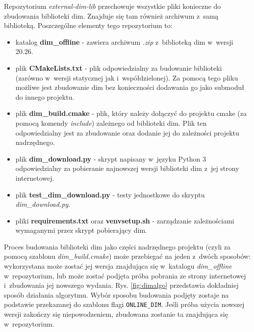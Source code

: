 Repozytorium \textit{external-dim-lib} przechowuje wszystkie pliki konieczne do zbudowania biblioteki \gls*{dim}. Znajduje się tam również archiwum z~samą biblioteką. Poszczególne elementy tego repozytorium to:
\begin{itemize}
\item katalog \textbf{dim\_offline} - zawiera archiwum \textit{.zip} z~biblioteką \gls*{dim} w~wersji 20.26.
\item plik \textbf{CMakeLists.txt} - plik odpowiedzialny za budowanie biblioteki (zarówno w~wersji statycznej jak i~współdzielonej). Za pomocą tego pliku możliwe jest zbudowanie \gls*{dim} bez konieczności dodawania go jako submoduł do innego projektu.
\item plik \textbf{dim\_build.cmake} - plik, który należy dołączyć do projektu \gls*{cmake} (za pomocą komendy \textit{include}) zależnego od biblioteki \gls*{dim}. Plik ten odpowiedzialny jest za zbudowanie oraz dodanie jej do zależności projektu nadrzędnego.
\item plik \textbf{dim\_download.py} - skrypt napisany w~języku Python 3 odpowiedzialny za pobieranie najnowszej wersji biblioteki \gls*{dim} z~jej strony internetowej.
\item plik \textbf{test\_dim\_download.py} - testy jednostkowe do skryptu \textit{dim\_download.py}.
\item pliki \textbf{requirements.txt} oraz \textbf{venvsetup.sh} - zarządzanie zależnościami wymaganymi przez skrypt pobierający \gls*{dim}.
\end{itemize}

Proces budowania biblioteki \gls*{dim} jako części nadrzędnego projektu (czyli za pomocą szablonu \textit{dim\_build.cmake}) może przebiegać na jeden z~dwóch sposobów: wykorzystana może zostać jej wersja znajdująca się w~katalogu \textit{dim\_offline} w~repozytorium, lub może zostać podjęta próba pobrania ze strony internetowej i~zbudowania jej nowszego wydania. Rys. \ref{fig:dimalgo} przedstawia dokładniej sposób działania algorytmu. Wybór sposobu budowania podjęty zostaje na podstawie przekazanej do szablonu flagi \lstinline{ONLINE_DIM}. Jeśli próba użycia nowszej wersji zakończy się niepowodzeniem, zbudowana zostanie ta znajdująca się w~repozytorium.

